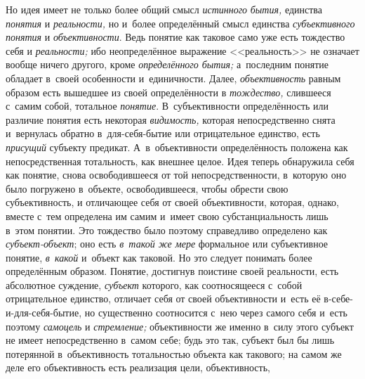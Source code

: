 Но идея имеет не только более общий смысл {\em истинного} {\em бытия,} единства
{\em понятия} и {\em реальности,} но и~более определённый смысл единства
{\em субъективного понятия} и {\em объективности}. Ведь понятие как таковое
само уже есть тождество себя и {\em реальности;} ибо неопределённое выражение
<<реальность>> не означает вообще ничего другого, кроме {\em определённого
бытия;} а~последним понятие обладает в~своей особенности и~единичности. Далее,
{\em объективность} равным образом есть вышедшее из своей определённости
в {\em тождество,} слившееся с~самим собой, тотальное {\em понятие}.
В~субъективности определённость или различие понятия есть некоторая
{\em видимость,} которая непосредственно снята и~вернулась обратно
в~для-себя-бытие или отрицательное единство, есть {\em присущий} субъекту
предикат. А~в~объективности определённость положена как непосредственная
тотальность, как внешнее целое. Идея теперь обнаружила себя как понятие,
снова освободившееся от той непосредственности, в~которую оно было
погружено в~объекте, освободившееся, чтобы обрести свою субъективность, и
отличающее себя от своей объективности, которая, однако, вместе с~тем
определена им самим и~имеет свою субстанциальность лишь в~этом понятии. Это
тождество было поэтому справедливо определено как
{\em субъект-объект}; оно есть {\em в~такой же
мере} формальное или субъективное понятие,
{\em в~какой} и~объект
как таковой. Но это следует понимать более определённым образом. Понятие,
достигнув поистине своей реальности, есть абсолютное суждение,
{\em субъект} которого,
как соотносящееся с~собой отрицательное единство, отличает
себя от своей объективности и~есть её в-себе-и-для-себя-бытие, но
существенно соотносится с~нею через самого себя и~есть поэтому
{\em самоцель} и {\em стремление;}
объективности же именно в~силу этого субъект не имеет
непосредственно в~самом себе; будь это так, субъект был бы лишь потерянной
в~объективность тотальностью объекта как такового; на самом же деле его
объективность есть реализация цели, объективность,
